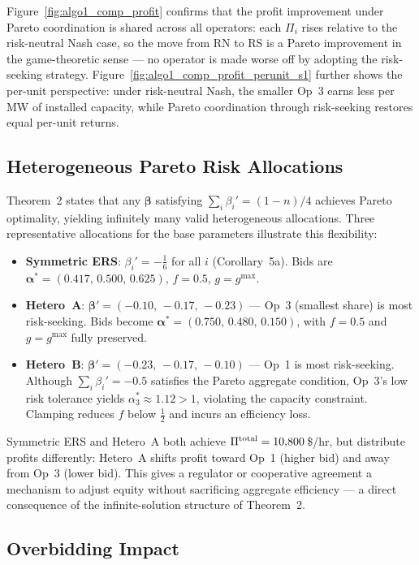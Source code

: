 \documentclass[conference]{IEEEtran}
\begin{document}
Figure~\ref{fig:algo1_comp_profit} confirms that the profit improvement under Pareto coordination is shared across all operators: each $\Pi_i$ rises relative to the risk-neutral Nash case, so the move from RN to RS is a Pareto improvement in the game-theoretic sense — no operator is made worse off by adopting the risk-seeking strategy. Figure~\ref{fig:algo1_comp_profit_perunit_s1} further shows the per-unit perspective: under risk-neutral Nash, the smaller Op~3 earns less per MW of installed capacity, while Pareto coordination through risk-seeking restores equal per-unit returns.

\subsection{Heterogeneous Pareto Risk Allocations}

Theorem~2 states that any $\boldsymbol{\beta}$ satisfying $\sum_i\beta_i' = (1-n)/4$ achieves Pareto optimality, yielding infinitely many valid heterogeneous allocations. Three representative allocations for the base parameters illustrate this flexibility:
\begin{itemize}
    \item \textbf{Symmetric ERS}: $\beta_i'=-\frac{1}{6}$ for all $i$ (Corollary~5a). Bids are $\boldsymbol{\alpha}^*=(0.417,\,0.500,\,0.625)$, $f=0.5$, $g=g^{\max}$.
    \item \textbf{Hetero~A}: $\boldsymbol{\beta}'=(-0.10,\,-0.17,\,-0.23)$ — Op~3 (smallest share) is most risk-seeking. Bids become $\boldsymbol{\alpha}^*=(0.750,\,0.480,\,0.150)$, with $f=0.5$ and $g=g^{\max}$ fully preserved.
    \item \textbf{Hetero~B}: $\boldsymbol{\beta}'=(-0.23,\,-0.17,\,-0.10)$ — Op~1 is most risk-seeking. Although $\sum_i\beta_i'=-0.5$ satisfies the Pareto aggregate condition, Op~3's low risk tolerance yields $\alpha_3^*\approx1.12>1$, violating the capacity constraint. Clamping reduces $f$ below $\frac{1}{2}$ and incurs an efficiency loss.
\end{itemize}

Symmetric ERS and Hetero~A both achieve $\Pi^{\rm total}=10{,}800$\,\$/hr, but distribute profits differently: Hetero~A shifts profit toward Op~1 (higher bid) and away from Op~3 (lower bid). This gives a regulator or cooperative agreement a mechanism to adjust equity without sacrificing aggregate efficiency — a direct consequence of the infinite-solution structure of Theorem~2.

\subsection{Overbidding Impact}
\end{document}
